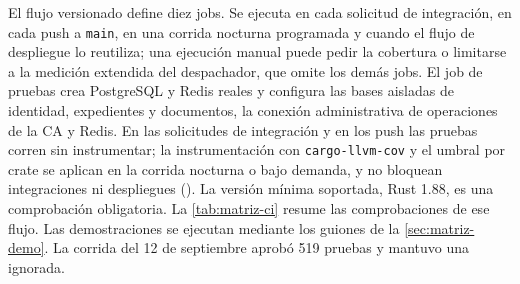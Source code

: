 El flujo versionado  define diez jobs. Se ejecuta en cada solicitud de integración, en cada push a \texttt{main}, en una corrida nocturna programada y cuando el flujo de despliegue lo reutiliza; una ejecución manual puede pedir la cobertura o limitarse a la medición extendida del despachador, que omite los demás jobs. El job de pruebas crea PostgreSQL y Redis reales y configura las bases aisladas de identidad, expedientes y documentos, la conexión administrativa de operaciones de la CA y Redis. En las solicitudes de integración y en los push las pruebas corren sin instrumentar; la instrumentación con \texttt{cargo-llvm-cov} y el umbral por crate se aplican en la corrida nocturna o bajo demanda, y no bloquean integraciones ni despliegues (). La versión mínima soportada, Rust 1.88, es una comprobación obligatoria. La \cref{tab:matriz-ci} resume las comprobaciones de ese flujo. Las demostraciones se ejecutan mediante los guiones de la \cref{sec:matriz-demo}. La corrida del 12 de septiembre aprobó 519 pruebas y mantuvo una ignorada.

